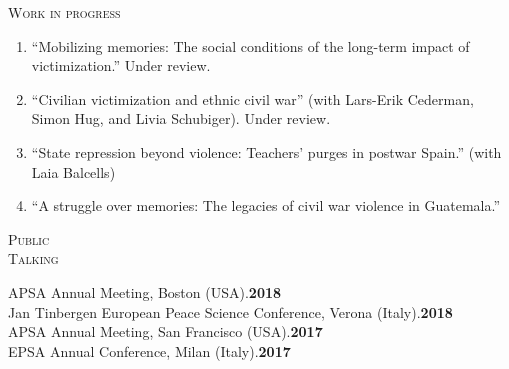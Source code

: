 \documentclass[a4paper, 10pt]{article}
\begin{document}
\vspace{8pt}


\noindent
\begin{minipage}[t]{0.13\textwidth}
  \flushleft
  \textsc{\footnotesize Work in progress}
\end{minipage}
\begin{minipage}[t]{0.87\textwidth}
  \begin{enumerate}[leftmargin=*, nolistsep]
  \item ``Mobilizing memories: The social conditions of the long-term impact of victimization.'' Under review.
  \item ``Civilian victimization and ethnic civil war'' (with Lars-Erik Cederman, Simon Hug, and Livia Schubiger). Under review.
	\item ``State repression beyond violence: Teachers' purges in postwar Spain.'' (with Laia Balcells)
  \item ``A struggle over memories: The legacies of civil war violence in Guatemala.''
  \end{enumerate}
\end{minipage}

\vspace{8pt}


\noindent
\begin{minipage}[t]{0.13\textwidth}
  \flushleft
  \textsc{\footnotesize Public\\Talking}
\end{minipage}
\begin{minipage}[t]{0.87\textwidth}
  APSA Annual Meeting, Boston (USA).\hfill{\bf 2018}\\
  Jan Tinbergen European Peace Science Conference, Verona (Italy).\hfill{\bf 2018}\\
  APSA Annual Meeting, San Francisco (USA).\hfill{\bf 2017}\\
  EPSA Annual Conference, Milan (Italy).\hfill{\bf 2017}
\end{minipage}

\vspace{8pt}

\end{document}
